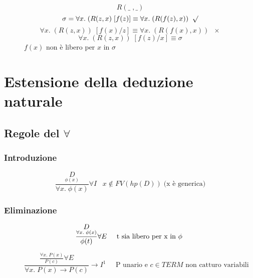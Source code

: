\documentclass{article}
\theoremstyle{break}
\theoremstyle{break}
\theoremstyle{break}
\theoremstyle{break}
\begin{document}
\begin{figure}[H]
  \begin{example}
    \[
    R(\_\;,\_)
    \] 
    \[
      \sigma=\forall x.\;(R(z,x)\;[f(z)] \equiv \forall x.\; (R(f(z),x)) \;\;\surd
    \] 
    \[
      \forall x.\; (R(z,x))\;[f(x)/z] \equiv \forall x.\; (R(f(x),x)) \;\;\times
    \] 
    \[
      \forall x.\; (R(z,x))\;[f(z)/x] \equiv \sigma
    \] 
    \( f(x) \) non è libero per \( x \) in \( \sigma \)
  \end{example}
\end{figure}

\section{Estensione della deduzione naturale}
\subsection{Regole del \( \forall  \)}
\subsubsection{Introduzione}
    \large\[
      \frac{\underset{\phi(x)}{D}}{\forall x.\; \phi(x)}\forall I \;\;\; x \notin FV(hp(D))\; \text{(x è generica)}
    \]
\subsubsection{Eliminazione}
  \large\[
    \frac{\underset{\forall x.\; \phi(x)}{D}}{\phi(t)} \forall E \;\;\;\;\; \text{t sia libero per x in \( \phi \) }
  \] 
  \begin{figure}[H]
    \begin{exercise}
      \[
        \frac{\frac{\forall x.\; P(x)}{P(c)}\forall E}{\forall x.\; P(x) \to P(c)} \to I^1 \;\;\;\;\; \text{P unario e \(c \in TERM \) non catturo variabili }
      \] 
    \end{exercise}
  \end{figure}
\end{document}
